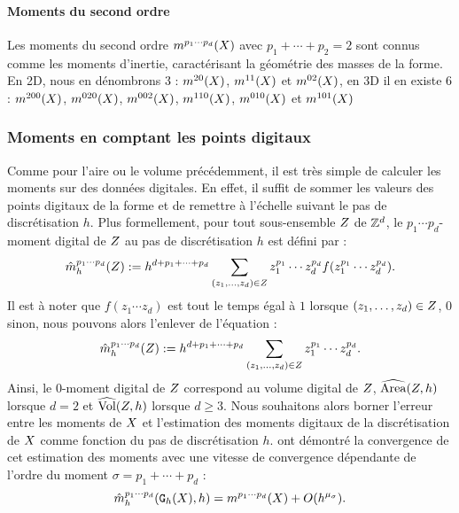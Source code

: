 \paragraph{Moments du second ordre}
%
Les moments du second ordre $\Mom{p_1 \cdots p_d}(\Shape)$ avec $p_1 + \cdots +
p_2 = 2$ sont connus comme les moments d'inertie, caractérisant la géométrie des
masses de la forme. En 2D, nous en dénombrons 3 : $\Mom{2 0}(\Shape)$, $\Mom{1
1}(\Shape)$ et $\Mom{0 2}(\Shape)$, en 3D il en existe 6 :  $\Mom{2 0
0}(\Shape)$, $\Mom{0 2 0}(\Shape)$, $\Mom{0 0 2}(\Shape)$, $\Mom{1 1
0}(\Shape)$, $\Mom{0 1 0}(\Shape)$ et $\Mom{1 0 1}(\Shape)$
%
\subsubsection{Moments en comptant les points digitaux}
%
Comme pour l'aire ou le volume précédemment, il est très simple de calculer les
moments sur des données digitales. En effet, il suffit de sommer les valeurs des
points digitaux de la forme et de remettre à l'échelle suivant le pas de
discrétisation $h$. Plus formellement, pour tout sous-ensemble $\DigShape$ de
$\Z^d$, le $p_1 \cdots p_d$-moment digital de $\DigShape$ au pas de
discrétisation $h$ est défini par :
%
\begin{equation}
  \DMom{p_1 \cdots p_d}{h}(\DigShape) \EqDef h^{d + p_1 + \cdots + p_d} \sum_{(z_1,\ldots,z_d) \in \DigShape} z_1^{p_1} \cdots z_d^{p_d} f(z_1^{p_1} \cdots z_d^{p_d}).
\end{equation}
%
Il est à noter que $f(z_1 \cdots z_d)$ est tout le temps égal à $1$ lorsque
$(z_1,\ldots,z_d) \in \DigShape$, $0$ sinon, nous pouvons alors l'enlever de
l'équation :
%
\begin{equation}
  \DMom{p_1 \cdots p_d}{h}(\DigShape) \EqDef h^{d + p_1 + \cdots + p_d} \sum_{(z_1,\ldots,z_d) \in \DigShape} z_1^{p_1} \cdots z_d^{p_d}.
\end{equation}
%
Ainsi, le $0$-moment digital de $\DigShape$ correspond au volume digital de
$\DigShape$, \cad $\AreaC(\DigShape,h)$ lorsque $d = 2$ et $\VolC(\DigShape,h)$
lorsque $d \geq 3$.
%
Nous souhaitons alors borner l'erreur entre les moments de $\Shape$ et
l'estimation des moments digitaux de la discrétisation de $\Shape$ comme
fonction du pas de discrétisation $h$.  ont
démontré la convergence de cet estimation des moments avec une vitesse de
convergence dépendante de l'ordre du moment $\sigma = p_1 + \cdots + p_d$ :
%
\begin{equation} \label{huxleylike}
%
  \DMom{p_1 \cdots p_d}{h}(\DigF{\Shape}{h},h) = \Mom{p_1 \cdots p_d}(\Shape) + O(h^{\mu_{\sigma}}).
%
\end{equation}
